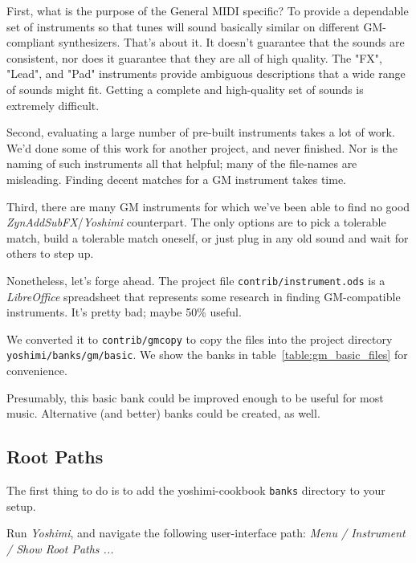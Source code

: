    First, what is the purpose of the General MIDI specific?
   To provide a
   dependable set of instruments so that tunes will sound basically similar
   on different GM-compliant synthesizers.  That's about it.  It doesn't
   guarantee that the sounds are consistent, nor does it guarantee that they
   are all of high quality.  The "FX", "Lead", and "Pad" instruments provide
   ambiguous descriptions that a wide range of sounds might fit.
   Getting a complete and high-quality set of sounds is extremely difficult.

   Second, evaluating a large number of pre-built instruments takes a lot of
   work.  We'd done some of this work for another project, and never
   finished.  Nor is the naming of such instruments all that helpful; many
   of the file-names are misleading.  Finding decent matches for a GM
   instrument takes time.

   Third, there are many GM instruments for which we've been able to find no
   good \textsl{ZynAddSubFX}/\textsl{Yoshimi} counterpart.  The only options
   are to pick a tolerable match, build a tolerable match oneself, or just
   plug in any old sound and wait for others to step up.

   Nonetheless, let's forge ahead.  The project file
   \texttt{contrib/instrument.ods}
   is a \textsl{LibreOffice} spreadsheet
   that represents some research in finding GM-compatible instruments.
   It's pretty bad; maybe 50\% useful.

   We converted it to \texttt{contrib/gmcopy} to copy the files
   into the project directory \texttt{yoshimi/banks/gm/basic}.
   We show the banks in table~\ref{table:gm_basic_files}
   for convenience.




   Presumably, this basic bank could be improved enough to be useful
   for most music.  Alternative (and better) banks could be created, as
   well.

\subsection{Root Paths}
\label{subsec:cookbook_banks_root_paths}

   The first thing to do is to add the yoshimi-cookbook \texttt{banks}
   directory to your setup.

   Run \textsl{Yoshimi}, and navigate the following user-interface path:
   \textsl{Menu / Instrument / Show Root Paths ...}

